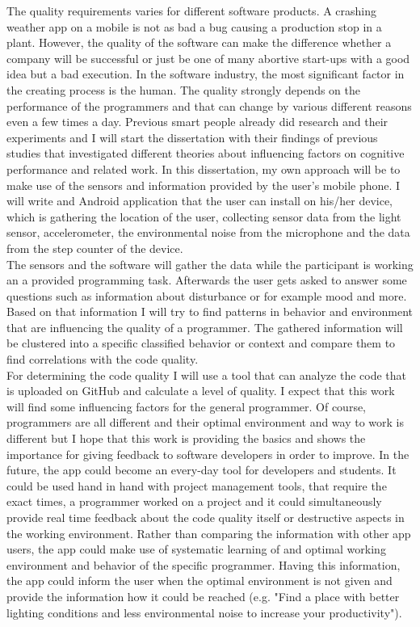 The quality requirements varies for different software products. A crashing weather app on a mobile is not as bad a bug causing a production stop in a plant. 
However, the quality of the software can make the difference whether a company will be successful or just be one of many abortive start-ups with a good idea but a bad execution.
\bigbreak
In the software industry, the most significant factor in the creating process is the human. The quality strongly depends on the performance of the programmers and that can change by various different reasons even a few times a day. Previous smart people already did research and their experiments and I will start the dissertation with their findings of previous studies that investigated different theories about influencing factors on cognitive performance and related work.
\bigbreak
In this dissertation, my own approach will be to make use of the sensors and information provided by the user's mobile phone. I will write and Android application that the user can install on his/her device, which is gathering the location of the user, collecting sensor data from the light sensor, accelerometer, the environmental noise from the microphone and the data from the step counter of the device. \\
The sensors and the software will gather the data while the participant is working an a provided programming task. Afterwards the user gets asked to answer some questions such as information about disturbance or for example mood and more. \\
Based on that information I will try to find patterns in behavior and environment that are influencing the quality of a programmer. The gathered information will be clustered into a specific classified behavior or context and compare them to find correlations with the code quality.\\
For determining the code quality I will use a tool that can analyze the code that is uploaded on GitHub and calculate a level of quality.
\bigbreak
I expect that this work will find some influencing factors for the general programmer. Of course, programmers are all different and their optimal environment and way to work is different but I hope that this work is providing the basics and shows the importance for giving feedback to software developers in order to improve.
\bigbreak
In the future, the app could become an every-day tool for developers and students. It could be used hand in hand with project management tools, that require the exact times, a programmer worked on a project and it could simultaneously provide real time feedback about the code quality itself or destructive aspects in the working environment. Rather than comparing the information with other app users, the app could make use of systematic learning of and optimal working environment and behavior of the specific programmer. Having this information, the app could inform the user when the optimal environment is not given and provide the information how it could be reached (e.g. "Find a place with better lighting conditions and less environmental noise to increase your productivity"). 


